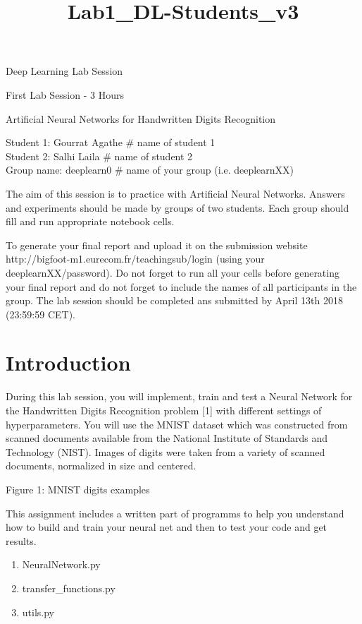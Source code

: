 \documentclass[11pt]{article}
\title{Lab1\_DL-Students\_v3}
\begin{document}
    
    
    \maketitle
    
    

    
    Deep Learning Lab Session

First Lab Session - 3 Hours

Artificial Neural Networks for Handwritten Digits Recognition

     Student 1: Gourrat Agathe \# name of student 1\\ Student 2: Salhi Laila
\# name of student 2\\ Group name: deeplearn0 \# name of your group
(i.e. deeplearnXX)

The aim of this session is to practice with Artificial Neural Networks.
Answers and experiments should be made by groups of two students. Each
group should fill and run appropriate notebook cells.

To generate your final report and upload it on the submission website
http://bigfoot-m1.eurecom.fr/teachingsub/login (using your
deeplearnXX/password). Do not forget to run all your cells before
generating your final report and do not forget to include the names of
all participants in the group. The lab session should be completed ans
submitted by April 13th 2018 (23:59:59 CET).

    \section{Introduction}\label{introduction}

    During this lab session, you will implement, train and test a Neural
Network for the Handwritten Digits Recognition problem {[}1{]} with
different settings of hyperparameters. You will use the MNIST dataset
which was constructed from scanned documents available from the National
Institute of Standards and Technology (NIST). Images of digits were
taken from a variety of scanned documents, normalized in size and
centered.

{Figure 1: MNIST digits examples}

This assignment includes a written part of programms to help you
understand how to build and train your neural net and then to test your
code and get results.

\begin{enumerate}
\def\labelenumi{\arabic{enumi}.}
\itemsep1pt\parskip0pt
\item
   NeuralNetwork.py 
\item
   transfer\_functions.py 
\item
   utils.py 
\end{enumerate}
\end{document}
